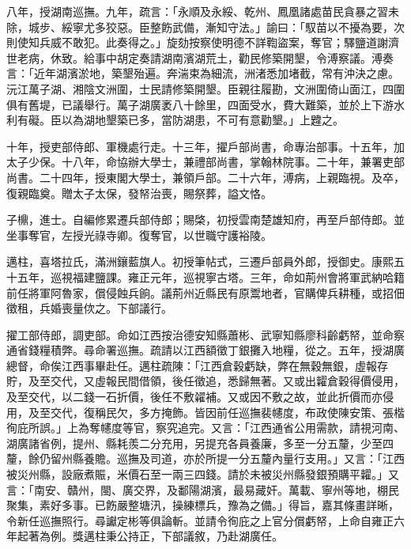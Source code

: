 \begin{pinyinscope}
八年，授湖南巡撫。九年，疏言：「永順及永綏、乾州、鳳凰諸處苗民貪暴之習未除，城步、綏寧尤多狡惡。臣整飭武備，漸知守法。」諭曰：「馭苗以不擾為要，次則使知兵威不敢犯。此奏得之。」旋劾按察使明德不詳鞫盜案，奪官；驛鹽道謝濟世老病，休致。給事中胡定奏請湖南濱湖荒土，勸民修築開墾，令溥察議。溥奏言：「近年湖濱淤地，築墾殆遍。奔湍束為細流，洲渚悉加堵截，常有沖決之慮。沅江萬子湖、湘陰文洲圍，士民請修築開墾。臣親往履勘，文洲圍倚山面江，四圍俱有舊堤，已議舉行。萬子湖廣袤八十餘里，四面受水，費大難築，並於上下游水利有礙。臣以為湖地墾築已多，當防湖患，不可有意勸墾。」上韙之。

十年，授吏部侍郎、軍機處行走。十三年，擢戶部尚書，命專治部事。十五年，加太子少保。十八年，命協辦大學士，兼禮部尚書，掌翰林院事。二十年，兼署吏部尚書。二十四年，授東閣大學士，兼領戶部。二十六年，溥病，上親臨視。及卒，復親臨奠。贈太子太保，發帑治喪，賜祭葬，謚文恪。

子檙，進士。自編修累遷兵部侍郎；賜棨，初授雲南楚雄知府，再至戶部侍郎。並坐事奪官，左授光祿寺卿。復奪官，以世職守護裕陵。

邁柱，喜塔拉氏，滿洲鑲藍旗人。初授筆帖式，三遷戶部員外郎，授御史。康熙五十五年，巡視福建鹽課。雍正元年，巡視寧古塔。三年，命如荊州會將軍武納哈籍前任將軍阿魯家，償侵蝕兵餉。議荊州近縣民有原鬻地者，官購俾兵耕種，或招佃徵租，兵婚喪量佽之。下部議行。

擢工部侍郎，調吏部。命如江西按治德安知縣蕭彬、武寧知縣廖科齡虧帑，並命察通省錢糧積弊。尋命署巡撫。疏請以江西額徵丁銀攤入地糧，從之。五年，授湖廣總督，命俟江西事畢赴任。邁柱疏陳：「江西倉穀虧缺，弊在無穀無銀，虛報存貯，及至交代，又虛報民間借領，後任徵追，悉歸無著。又或出糶倉穀得價侵用，及至交代，以二錢一石折價，後任不敷糴補。又或因不敷之故，並此折價而亦侵用，及至交代，復稱民欠，多方掩飾。皆因前任巡撫裴幰度，布政使陳安策、張楷徇庇所誤。」上為奪幰度等官，察究追完。又言：「江西通省公用需款，請視河南、湖廣諸省例，提州、縣耗羨二分充用，另提充各員養廉，多至一分五釐，少至四釐，餘仍留州縣養贍。巡撫及司道，亦於所提一分五釐內量行支用。」又言：「江西被災州縣，設廠煮賑，米價石至一兩三四錢。請於未被災州縣發銀預購平糶。」又言：「南安、贛州，閩、廣交界，及鄱陽湖濱，最易藏奸。萬載、寧州等地，棚民聚集，素好多事。已飭嚴整塘汛，操練標兵，豫為之備。」得旨，嘉其條畫詳晰，令新任巡撫照行。尋讞定彬等俱論斬。並請令徇庇之上官分償虧帑，上命自雍正六年起著為例。獎邁柱秉公持正，下部議敘，乃赴湖廣任。


\end{pinyinscope}
